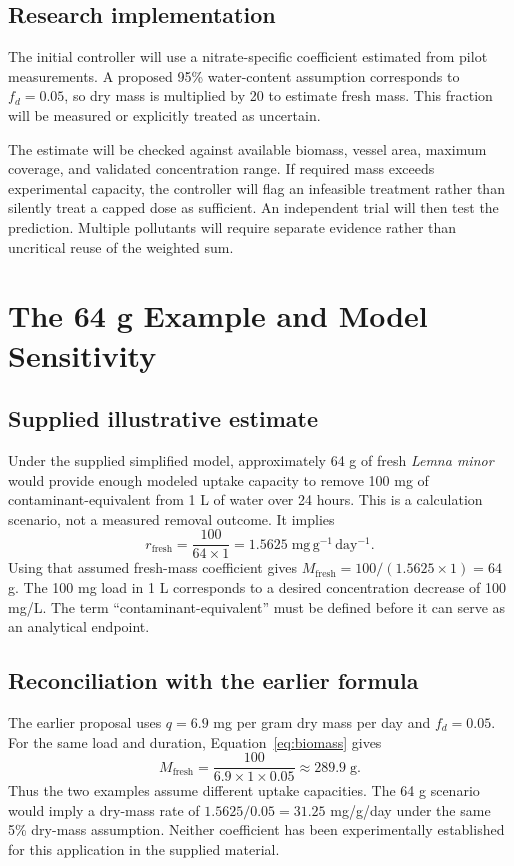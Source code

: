 \documentclass[12pt,a4paper]{article}
\newcommand{\papersection}[1]{\clearpage\section{#1}}
\begin{document}
\subsection{Research implementation}
The initial controller will use a nitrate-specific coefficient estimated from pilot measurements. A proposed 95\% water-content assumption corresponds to $f_d=0.05$, so dry mass is multiplied by 20 to estimate fresh mass. This fraction will be measured or explicitly treated as uncertain.

The estimate will be checked against available biomass, vessel area, maximum coverage, and validated concentration range. If required mass exceeds experimental capacity, the controller will flag an infeasible treatment rather than silently treat a capped dose as sufficient. An independent trial will then test the prediction. Multiple pollutants will require separate evidence rather than uncritical reuse of the weighted sum.

\papersection{The 64 g Example and Model Sensitivity}
\subsection{Supplied illustrative estimate}
Under the supplied simplified model, approximately 64 g of fresh \textit{Lemna minor} would provide enough modeled uptake capacity to remove 100 mg of contaminant-equivalent from 1 L of water over 24 hours. This is a calculation scenario, not a measured removal outcome. It implies
\[
r_{\mathrm{fresh}}=\frac{100}{64\times1}
=1.5625\;\mathrm{mg\,g^{-1}\,day^{-1}}.
\]
Using that assumed fresh-mass coefficient gives $M_{\mathrm{fresh}}=100/(1.5625\times1)=64$ g. The 100 mg load in 1 L corresponds to a desired concentration decrease of 100 mg/L. The term ``contaminant-equivalent'' must be defined before it can serve as an analytical endpoint.

\subsection{Reconciliation with the earlier formula}
The earlier proposal uses $q=6.9$ mg per gram dry mass per day and $f_d=0.05$. For the same load and duration, Equation~\ref{eq:biomass} gives
\[
M_{\mathrm{fresh}}=\frac{100}{6.9\times1\times0.05}
\approx289.9\;\mathrm{g}.
\]
Thus the two examples assume different uptake capacities. The 64 g scenario would imply a dry-mass rate of $1.5625/0.05=31.25$ mg/g/day under the same 5\% dry-mass assumption. Neither coefficient has been experimentally established for this application in the supplied material.
\end{document}
